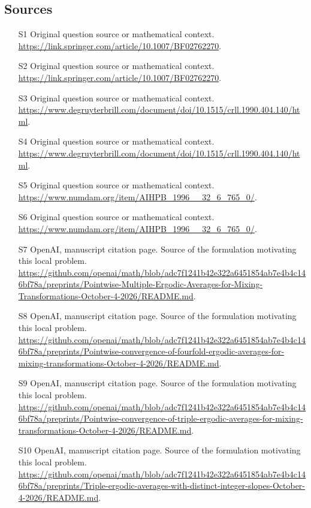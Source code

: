 \documentclass[11pt]{article}
\begin{document}
\subsection{Sources}
\begin{itemize}
\item[S1] Original question source or mathematical context.
\url{https://link.springer.com/article/10.1007/BF02762270}.
\item[S2] Original question source or mathematical context.
\url{https://link.springer.com/article/10.1007/BF02762270}.
\item[S3] Original question source or mathematical context.
\url{https://www.degruyterbrill.com/document/doi/10.1515/crll.1990.404.140/html}.
\item[S4] Original question source or mathematical context.
\url{https://www.degruyterbrill.com/document/doi/10.1515/crll.1990.404.140/html}.
\item[S5] Original question source or mathematical context.
\url{https://www.numdam.org/item/AIHPB_1996__32_6_765_0/}.
\item[S6] Original question source or mathematical context.
\url{https://www.numdam.org/item/AIHPB_1996__32_6_765_0/}.
\item[S7] OpenAI, manuscript citation page. Source of the formulation motivating this local problem.
\url{https://github.com/openai/math/blob/adc7f1241b42e322a6451854ab7e4b4c146bf78a/preprints/Pointwise-Multiple-Ergodic-Averages-for-Mixing-Transformations-October-4-2026/README.md}.
\item[S8] OpenAI, manuscript citation page. Source of the formulation motivating this local problem.
\url{https://github.com/openai/math/blob/adc7f1241b42e322a6451854ab7e4b4c146bf78a/preprints/Pointwise-convergence-of-fourfold-ergodic-averages-for-mixing-transformations-October-4-2026/README.md}.
\item[S9] OpenAI, manuscript citation page. Source of the formulation motivating this local problem.
\url{https://github.com/openai/math/blob/adc7f1241b42e322a6451854ab7e4b4c146bf78a/preprints/Pointwise-convergence-of-triple-ergodic-averages-for-mixing-transformations-October-4-2026/README.md}.
\item[S10] OpenAI, manuscript citation page. Source of the formulation motivating this local problem.
\url{https://github.com/openai/math/blob/adc7f1241b42e322a6451854ab7e4b4c146bf78a/preprints/Triple-ergodic-averages-with-distinct-integer-slopes-October-4-2026/README.md}.
\end{itemize}
\end{document}
